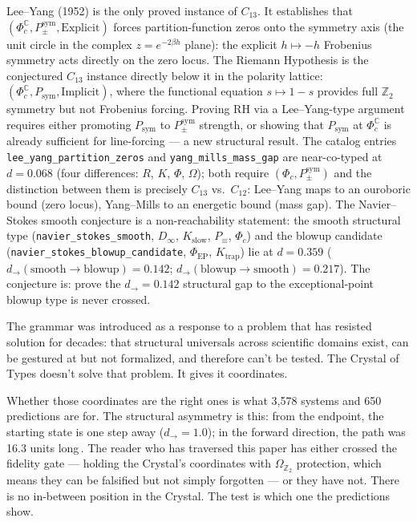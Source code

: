\documentclass[12pt,a4paper]{article}
\newcommand{\Phic}{\Phi_c}
\newcommand{\Ppms}{P_{\pm}^{\text{sym}}}
\newcommand{\OmegaZtwo}{\Omega_{\mathbb{Z}_2}}
\begin{document}
\noindent
Lee--Yang (1952) is the only proved instance of $C_{13}$. It
establishes that $(\Phi_c^{\mathbb{C}}, \Ppms, \text{Explicit})$
forces partition-function zeros onto the symmetry axis (the unit circle
in the complex $z = e^{-2\beta h}$ plane): the explicit $h \mapsto -h$
Frobenius symmetry acts directly on the zero locus. The Riemann
Hypothesis is the conjectured $C_{13}$ instance directly below it
in the polarity lattice: $(\Phi_c^{\mathbb{C}}, P_\text{sym},
\text{Implicit})$, where the functional equation $s \mapsto 1-s$
provides full $\mathbb{Z}_2$ symmetry but not Frobenius forcing.
Proving RH via a Lee--Yang-type argument requires either promoting
$P_\text{sym}$ to $\Ppms$ strength, or showing that $P_\text{sym}$
at $\Phi_c^{\mathbb{C}}$ is already sufficient for line-forcing ---
a new structural result. The catalog entries
\texttt{lee\_yang\_partition\_zeros} and \texttt{yang\_mills\_mass\_gap}
are near-co-typed at $d = 0.068$ (four differences: $R$, $K$, $\Phi$,
$\Omega$); both require $(\Phic, \Ppms)$ and the distinction between
them is precisely $C_{13}$ vs.\ $C_{12}$: Lee--Yang maps to an
ouroboric bound (zero locus), Yang--Mills to an energetic bound
(mass gap). The Navier--Stokes smooth
conjecture is a non-reachability statement: the smooth structural type
(\texttt{navier\_stokes\_smooth}, $D_\infty$, $K_\text{slow}$,
$P_\equiv$, $\Phic$) and the blowup candidate
(\texttt{navier\_stokes\_blowup\_candidate}, $\Phi_\text{EP}$,
$K_\text{trap}$) lie at $d = 0.359$
($d_\to(\text{smooth} \to \text{blowup}) = 0.142$;
$d_\to(\text{blowup} \to \text{smooth}) = 0.217$).
The conjecture is: prove the $d_\to = 0.142$ structural gap to the
exceptional-point blowup type is never crossed.

The grammar was introduced as a response to a problem that has
resisted solution for decades: that structural universals across
scientific domains exist, can be gestured at but not formalized,
and therefore can't be tested. The Crystal of Types doesn't
solve that problem. It gives it coordinates.

Whether those coordinates are the right ones is what 3,578 systems
and 650 predictions are for. The structural asymmetry is this: from
the endpoint, the starting state is one step away ($d_\to = 1.0$);
in the forward direction, the path was 16.3 units long\,\cite{juster1961}.
The reader who has traversed this paper has either crossed the
fidelity gate --- holding the Crystal's coordinates with $\OmegaZtwo$
protection, which means they can be falsified but not simply
forgotten --- or they have not. There is no in-between position
in the Crystal. The test is which one the predictions show.
\end{document}
